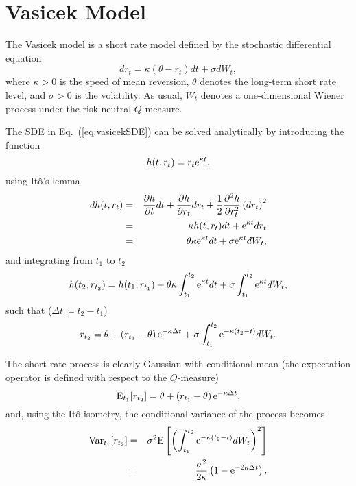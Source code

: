 \section{Vasicek Model}
The Vasicek model \cite{Vasicek1977} is a short rate model defined by the stochastic differential equation 
\begin{equation}
dr_t = \kappa \left( \theta - r_t \right) dt + \sigma dW_t,
\label{eq:vasicekSDE}
\end{equation}
where $\kappa > 0$ is the speed of mean reversion, $\theta$ denotes the long-term short rate level, and $\sigma > 0$ is the volatility.
As usual, $W_t$ denotes a one-dimensional Wiener process under the risk-neutral $Q$-measure.

The SDE in Eq.~(\ref{eq:vasicekSDE}) can be solved analytically by introducing the function
\begin{equation}
h(t, r_t) = r_t \text{e}^{\kappa t},
\end{equation}
using It\^{o}'s lemma
\begin{eqnarray}
dh(t, r_t) &=& \frac{\partial h}{\partial t} dt + \frac{\partial h}{\partial r_t} dr_t + \frac{1}{2}\frac{\partial^2 h}{\partial r_t^2} \left(dr_t\right)^2 \\
&=& \kappa h(t, r_t) dt + \text{e}^{\kappa t} dr_t \\
&=& \theta \kappa \text{e}^{\kappa t} dt + \sigma \text{e}^{\kappa t} dW_t,
\end{eqnarray}
and integrating from $t_1$ to $t_2$
\begin{equation}
h(t_2, r_{t_2}) = h(t_1, r_{t_1}) + \theta \kappa \int_{t_1}^{t_2} \text{e}^{\kappa t} dt + \sigma \int_{t_1}^{t_2} \text{e}^{\kappa t} dW_t,
\end{equation}
such that ($\Delta t \coloneq t_2 - t_1$)
\begin{equation}
r_{t_2} = \theta + \left( r_{t_1} - \theta \right) \text{e}^{-\kappa \Delta t} + \sigma \int_{t_1}^{t_2} \text{e}^{-\kappa \left(t_2 - t\right)} dW_t.
\end{equation}

The short rate process is clearly Gaussian with conditional mean (the expectation operator is defined with respect to the $Q$-measure)
\begin{equation}
\mathrm{E}_{t_1}\! \left[ r_{t_2} \right] = \theta + \left( r_{t_1} - \theta \right) \text{e}^{-\kappa \Delta t},
\end{equation}
and, using the It\^{o} isometry, the conditional variance of the process becomes
\begin{eqnarray}
\mathrm{Var}_{t_1}\! \left[ r_{t_2} \right] &=& \sigma^2 \mathrm{E} \left[ \left( \int_{t_1}^{t_2} \text{e}^{-\kappa \left(t_2 - t\right)} dW_t \right)^2 \right] \\
&=& \frac{\sigma^2}{2 \kappa} \left( 1 - \text{e}^{-2 \kappa \Delta t}\right).
\end{eqnarray}


